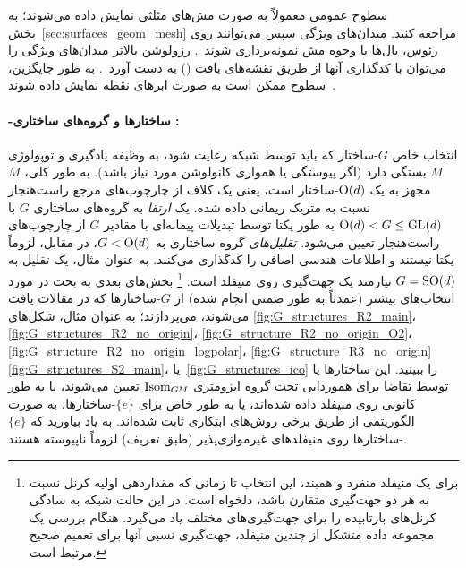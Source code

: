 سطوح عمومی معمولاً به صورت مش‌های مثلثی نمایش داده می‌شوند؛ به بخش~\ref{sec:surfaces_geom_mesh} مراجعه کنید.
میدان‌های ویژگی سپس می‌توانند روی رئوس، یال‌ها یا وجوه مش نمونه‌برداری شوند~\cite{deGoes2016VectorFieldProcessing}.
رزولوشن بالاتر میدان‌های ویژگی را می‌توان با کدگذاری آنها از طریق نقشه‌های بافت () به دست آورد~\cite{li2019crossAtlas,huang2019texturenet}.
به طور جایگزین، سطوح ممکن است به صورت ابرهای نقطه نمایش داده شوند~\cite{tatarchenko2018tangent,jin2019NPTCnet}.

\paragraph{\textit{}-ساختارها \textit{} و گروه‌های ساختاری \textit{}:}
انتخاب خاص $G$-ساختار که باید توسط شبکه رعایت شود، به وظیفه یادگیری و توپولوژی $M$ بستگی دارد (اگر پیوستگی یا همواری کانولوشن مورد نیاز باشد).
به طور کلی، $M$ مجهز به یک $\operatorname{O}(d)$-ساختار است، یعنی یک کلاف از چارچوب‌های مرجع راست‌هنجار نسبت به متریک ریمانی داده شده.
یک \emph{ارتقا} به گروه‌های ساختاری $G$ با ${\operatorname{O}(d) < G \leq \operatorname{GL}(d)}$ به طور یکتا توسط تبدیلات پیمانه‌ای با مقادیر $G$ از چارچوب‌های راست‌هنجار تعیین می‌شود.
\emph{تقلیل‌های} گروه ساختاری به $G < \operatorname{O}(d)$، در مقابل، لزوماً یکتا نیستند و اطلاعات هندسی اضافی را کدگذاری می‌کنند.
به عنوان مثال، یک تقلیل به $G=\operatorname{SO}(d)$ نیازمند یک جهت‌گیری روی منیفلد است.%
\footnote{
	برای یک منیفلد منفرد و همبند، این انتخاب تا زمانی که مقداردهی اولیه کرنل نسبت به هر دو جهت‌گیری متقارن باشد، دلخواه است.
	در این حالت شبکه به سادگی کرنل‌های بازتابیده را برای جهت‌گیری‌های مختلف یاد می‌گیرد.
	هنگام بررسی یک مجموعه داده متشکل از چندین منیفلد، جهت‌گیری نسبی آنها برای تعمیم صحیح مرتبط است.
}
بخش‌های بعدی به بحث در مورد انتخاب‌های بیشتر (عمدتاً به طور ضمنی انجام شده) از $G$-ساختارها که در مقالات یافت می‌شوند، می‌پردازند؛ به عنوان مثال، شکل‌های
\ref{fig:G_structures_R2_main}،
\ref{fig:G_structures_R2_no_origin}،
\ref{fig:G_structure_R2_no_origin_O2}،
\ref{fig:G_structure_R2_no_origin_logpolar}،
\ref{fig:G_structure_R3_no_origin}
\ref{fig:G_structures_S2_main}،
یا~\ref{fig:G_structures_ico} را ببینید.
این ساختارها یا توسط تقاضا برای هموردایی تحت گروه ایزومتری $\operatorname{Isom}_{G\mkern-1.4muM}$ تعیین می‌شوند، یا به طور کانونی روی منیفلد داده شده‌اند، یا به طور خاص برای $\{e\}$-ساختارها، به صورت الگوریتمی از طریق برخی روش‌های ابتکاری ثابت شده‌اند.
به یاد بیاورید که $\{e\}$-ساختارها روی منیفلدهای غیرموازی‌پذیر (طبق تعریف) لزوماً ناپیوسته هستند.

